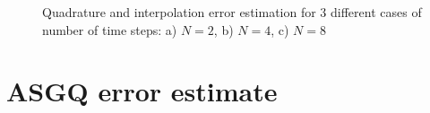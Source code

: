 \documentclass[11pt]{article}
\begin{document}
\begin{figure}[htb]
\begin{subfigure}{0.6\textwidth}
		\caption{}
		\label{fig:3}
	\end{subfigure}
	\caption{Quadrature and interpolation error estimation for 3 different cases of number of time steps: a) $N=2$, b) $N=4$,  c) $N=8$}
	\label{fig:Quadrature and interpolation error estimation for 3 different cases of number of time steps}
\end{figure}
\FloatBarrier

\section{ASGQ error estimate}\label{sec:MISC error estimate}


%




 








 

 

 
 
 
\end{document}
